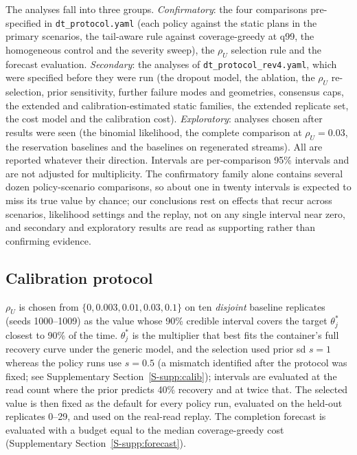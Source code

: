 \documentclass[conference,onecolumn,11pt]{IEEEtran}
\begin{document}
The analyses fall into three groups.  \emph{Confirmatory}: the four comparisons pre-specified in
\texttt{dt\_protocol.yaml} (each policy against the static plans in the primary scenarios, the
tail-aware rule against coverage-greedy at q99, the homogeneous control and the severity sweep), the
$\rho_U$ selection rule and the forecast evaluation.  \emph{Secondary}: the analyses of
\texttt{dt\_protocol\_rev4.yaml}, which were specified before they were run (the dropout model, the
ablation, the $\rho_U$ re-selection, prior sensitivity, further failure modes and geometries, consensus
caps, the extended and calibration-estimated static families, the extended replicate set, the cost model
and the calibration cost).  \emph{Exploratory}: analyses chosen after results were seen (the binomial
likelihood, the complete comparison at $\rho_U{=}0.03$, the reservation baselines and the baselines on
regenerated streams).  All are reported whatever their direction.  Intervals are per-comparison 95\%
intervals and are not adjusted for multiplicity.  The confirmatory family alone contains several dozen
policy-scenario comparisons, so about one in twenty intervals is expected to miss its true value by
chance; our conclusions rest on effects that recur across scenarios, likelihood settings and the replay,
not on any single interval near zero, and secondary and exploratory results are read as supporting rather
than confirming evidence.

\subsection{Calibration protocol}\label{sec:calib-protocol}
$\rho_U$ is chosen from $\{0, 0.003, 0.01, 0.03, 0.1\}$ on ten \emph{disjoint} baseline
replicates (seeds 1000--1009) as the value whose 90\% credible interval covers the target
$\theta^\ast_j$ closest to 90\% of the time.  $\theta^\ast_j$ is the multiplier that best fits the
container's full recovery curve under the generic model, and the selection used prior sd $s{=}1$
whereas the policy runs use $s{=}0.5$ (a mismatch identified after the protocol was fixed; see
Supplementary Section~\ref{S-supp:calib}); intervals are evaluated at the read
count where the prior predicts 40\% recovery and at twice that.  The selected value is then fixed
as the default for every policy run, evaluated on the held-out replicates 0--29, and used on
the real-read replay.  The completion forecast is evaluated with a budget equal to the median
coverage-greedy cost (Supplementary Section~\ref{S-supp:forecast}).
\end{document}
